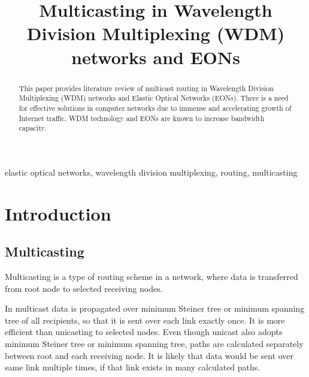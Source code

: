 \documentclass[conference]{IEEEtran}
\begin{document}
\title{Multicasting in Wavelength Division Multiplexing (WDM) networks and EONs}

\author{
\and
{}
}

\maketitle

\begin{abstract}
This paper provides literature review of multicast routing in Wavelength Division Multiplexing (WDM) networks and Elastic Optical Networks (EONs). There is a need for effective solutions in computer networks due to immense and accelerating growth of Internet traffic. WDM technology and EONs are known to increase bandwidth capacity.
\end{abstract}

\begin{IEEEkeywords}
elastic optical networks, wavelength division multiplexing, routing, multicasting
\end{IEEEkeywords}

\section{Introduction}

\subsection{Multicasting}
Multicasting is a type of routing scheme in a network, where data is transferred from root node to selected receiving nodes.

In multicast data is propagated over minimum Steiner tree or minimum spanning tree of all recipients, so that it is sent over each link exactly once. It is more efficient than unicasting to selected nodes. Even though unicast also adopts minimum Steiner tree or minimum spanning tree, paths are calculated separately between root and each receiving node. It is likely that data would be sent over same link multiple times, if that link exists in many calculated paths.
\end{document}
